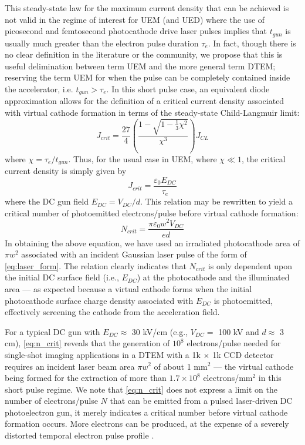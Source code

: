This steady-state law for the maximum current density that can be achieved is not valid in the regime of interest for UEM (and UED) where the use of picosecond and femtosecond photocathode drive laser pulses implies that $t_{gun}$ is usually much greater than the electron pulse duration $\tau_e$.
In fact, though there is no clear definition in the literature or the community, we propose that this is useful delimination between term UEM and the more general term DTEM; reserving the term UEM for when the pulse can be completely contained inside the accelerator, i.e. $t_{gun} > \tau_e$.
In this short pulse case, an equivalent diode approximation \cite{valfells_effects_2002} allows for the definition of a critical current density associated with virtual cathode formation in terms of the steady-state Child-Langmuir limit:
\begin{equation}
  J_{crit} = \frac{27}{4} \left ( \frac{ 1 - \sqrt{1-\tfrac{1}{3} \chi^2} }{ \chi^3 } \right ) J_{CL}
\end{equation}
where $\chi = \tau_e / t_{gun}$.
Thus, for the usual case in UEM, where $\chi \ll 1$, the critical current density is simply given by
\begin{equation}
  J_{crit} = \frac{\varepsilon_0 E_{DC}}{\tau_e}
\end{equation}
where the DC gun field $E_{DC} = V_{DC}/d$.
This relation may be rewritten to yield a critical number of photoemitted electrons/pulse before virtual cathode formation:
\begin{equation} \label{eq:n_crit}
  N_{crit} = \frac{\pi \varepsilon_0 w^2 V_{DC}}{e d}
\end{equation}
In obtaining the above equation, we have used an irradiated photocathode area of $\pi w^2$ associated with an incident Gaussian laser pulse of the form of \ref{eq:laser_form}.
The relation clearly indicates that $N_{crit}$ is only dependent upon the initial DC surface field (i.e., $E_{DC}$) at the photocathode and the illuminated area --- as expected because a virtual cathode forms when the initial photocathode surface charge density associated with $E_{DC}$ is photoemitted, effectively screening the cathode from the acceleration field.

For a typical DC gun with $E_{DC} \approx $ 30 kV/cm (e.g., $V_{DC} = $ 100 kV and $d \approx $ 3 cm), \ref{eq:n_crit} reveals that the generation of $10^8$ electrons/pulse needed for single-shot imaging applications in a DTEM with a 1k $\times$ 1k CCD detector requires an incident laser beam area $\pi w^2$ of about 1 mm$^2$ --- the virtual cathode being formed for the extraction of more than $1.7 \times 10^8$ electrons/mm$^2$ in this short pulse regime.
We note that \ref{eq:n_crit} does not express a limit on the number of electrons/pulse $N$ that can be emitted from a pulsed laser-driven DC photoelectron gun, it merely indicates a critical number before virtual cathode formation occurs.
More electrons can be produced, at the expense of a severely distorted temporal electron pulse profile \cite{valfells_effects_2002}.

